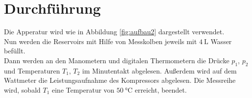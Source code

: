 \section{Durchführung}
\label{sec:Durchführung}
Die Apperatur wird wie in Abbildung \ref{fig:aufbau2} dargestellt verwendet.\\
Nun werden die Reservoirs mit Hilfe von Messkolben jeweils mit $\SI{4}{\liter}$ Wasser befüllt.\\
Dann werden an den Manometern und digitalen Thermometern die Drücke $p_1$, $p_2$ und Temperaturen
$T_1$, $T_2$ im Minutentakt abgelesen. Außerdem wird auf dem Wattmeter die Leistungsaufnahme des Kompressors abgelesen.
Die Messreihe wird, sobald $T_1$ eine Temperatur von $\SI{50}{\celsius}$ erreicht, beendet.